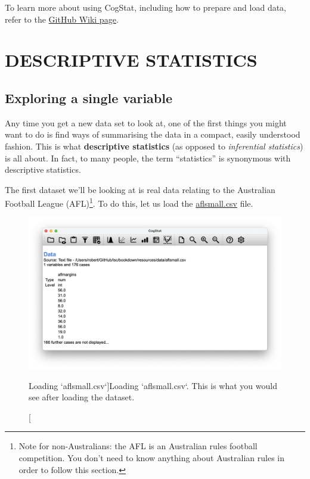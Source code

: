 \documentclass[
  11pt,
]{book}
\theoremstyle{indenteddefinition}
\theoremstyle{indenteddefinition}
\theoremstyle{definition}
\theoremstyle{definition}
\theoremstyle{remark}
\begin{document}
To learn more about using CogStat, including how to prepare and load data, refer to the \href{https://github.com/cogstat/cogstat/wiki/Documentation-for-users}{GitHub Wiki page}.

\hypertarget{part-descriptive-statistics}{%
\part*{DESCRIPTIVE STATISTICS}\label{part-descriptive-statistics}}

\hypertarget{exploringavariable}{%
\chapter{Exploring a single variable}\label{exploringavariable}}

Any time you get a new data set to look at, one of the first things you might want to do is find ways of summarising the data in a compact, easily understood fashion. This is what \textbf{descriptive statistics} (as opposed to \emph{inferential statistics}) is all about. In fact, to many people, the term ``statistics'' is synonymous with descriptive statistics.

The first dataset we'll be looking at is real data relating to the Australian Football League (AFL)\footnote{Note for non-Australians: the AFL is an Australian rules football competition. You don't need to know anything about Australian rules in order to follow this section.}. To do this, let us load the \href{resources/data/aflsmall.csv}{aflsmall.csv} file.

\begin{figure}

{\centering \includegraphics[width=0.66\linewidth]{resources/image/loadaflsmall} 

}

\caption[Loading `aflsmall.csv`]{Loading `aflsmall.csv`. This is what you would see after loading the dataset.}\label{fig:loadaflsmall}
\end{figure}
\end{document}
